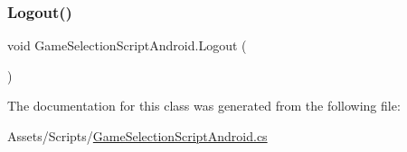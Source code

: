 \mbox{\label{classGameSelectionScriptAndroid_a3d4672995a51ea099f3952c8c575e65b}} 
\subsubsection{\texorpdfstring{Logout()}{Logout()}}
{\footnotesize\ttfamily void Game\+Selection\+Script\+Android.\+Logout (\begin{DoxyParamCaption}{ }\end{DoxyParamCaption})\hspace{0.3cm}{\ttfamily [inline]}}



The documentation for this class was generated from the following file\+:\begin{DoxyCompactItemize}
\item 
Assets/\+Scripts/\hyperlink{GameSelectionScriptAndroid_8cs}{Game\+Selection\+Script\+Android.\+cs}\end{DoxyCompactItemize}
